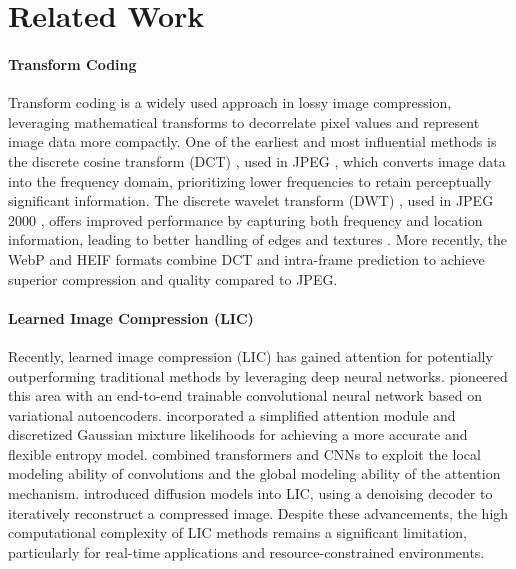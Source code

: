 \section{Related Work} \label{sec:related_work}

\paragraph{Transform Coding}
Transform coding is a widely used approach in lossy image compression, leveraging mathematical transforms to decorrelate pixel values and represent image data more compactly. One of the earliest and most influential methods is the discrete cosine transform (DCT) \cite{ahmed1974discrete}, used in JPEG \cite{wallace1991jpeg}, which converts image data into the frequency domain, prioritizing lower frequencies to retain perceptually significant information. The discrete wavelet transform (DWT) \cite{antonini1992image}, used in JPEG 2000 \cite{skodras2001jpeg}, offers improved performance by capturing both frequency and location information, leading to better handling of edges and textures \cite{shapiro1993embedded}. More recently, the WebP \cite{google2011webp} and HEIF \cite{lainema2016hevc, hannuksela2015high} formats combine DCT and intra-frame prediction to achieve superior compression and quality compared to JPEG.

\paragraph{Learned Image Compression (LIC)}
Recently, learned image compression (LIC) has gained attention for potentially outperforming traditional methods by leveraging deep neural networks. \textcite{balle2018variational} pioneered this area with an end-to-end trainable convolutional neural network based on variational autoencoders. \textcite{cheng2020learned} incorporated a simplified attention module and discretized Gaussian mixture likelihoods for achieving a more accurate and flexible entropy model. \textcite{liu2023learned} combined transformers and CNNs to exploit the local modeling ability of convolutions and the global modeling ability of the attention mechanism. \textcite{yang2024lossy} introduced diffusion models into LIC, using a denoising decoder to iteratively reconstruct a compressed image. Despite these advancements, the high computational complexity of LIC methods remains a significant limitation, particularly for real-time applications and resource-constrained environments.

